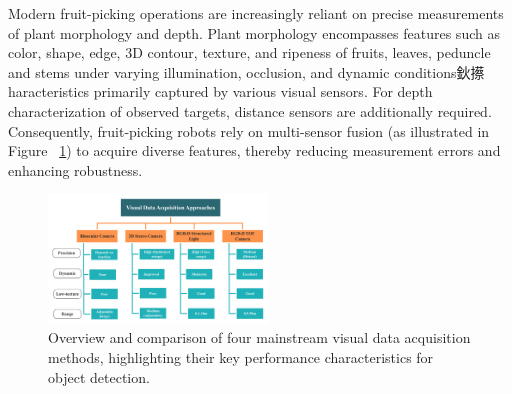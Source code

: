 \documentclass[a4paper,fleqn]{cas-dc}
\begin{document}
Modern fruit-picking operations are increasingly reliant on precise measurements of plant morphology and depth. Plant morphology encompasses features such as color, shape, edge, 	3D contour, texture, and ripeness of fruits, leaves, peduncle and stems under varying illumination, occlusion, and dynamic conditions鈥攃haracteristics primarily captured by various visual sensors. For depth characterization of observed targets, distance sensors are additionally required. 
Consequently, fruit-picking robots rely on multi-sensor fusion (as illustrated in Figure ~\ref{fig:camera}) to acquire diverse features, thereby reducing measurement errors and enhancing robustness.
\begin{figure}[hbtp]
\centering
\includegraphics[width=0.52\textwidth]{fig_camera1.png}
\caption{Overview and comparison of four mainstream visual data acquisition methods, highlighting their key performance characteristics for object detection.}
\label{fig:camera}
\end{figure}
\end{document}
